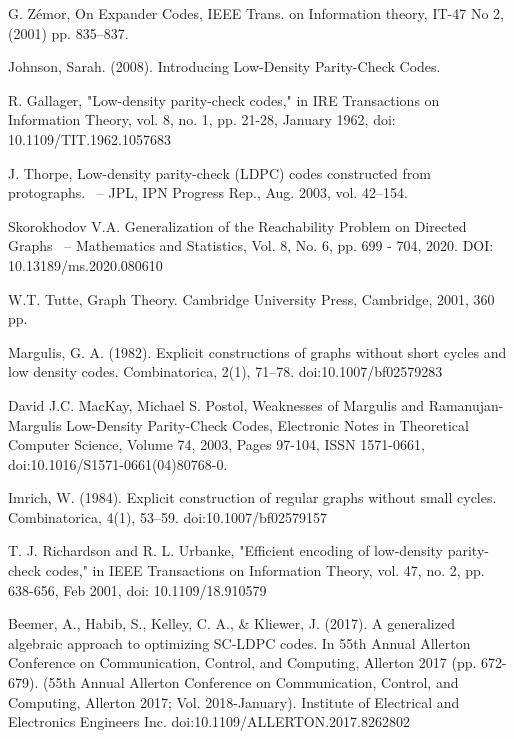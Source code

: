 \documentclass[a4paper,fleqn]{cas-sc}
\newcounter{definition}[section]
\begin{document}
\begin{thebibliography}{0}

G. Zémor, On Expander Codes, IEEE Trans. on Information theory, IT-47
No 2, (2001) pp. 835–837.
  
Johnson, Sarah. (2008). Introducing Low-Density Parity-Check Codes. 

R. Gallager, "Low-density parity-check codes," in IRE Transactions on Information Theory, vol. 8, no. 1, pp. 21-28, January 1962, doi: 10.1109/TIT.1962.1057683

J. Thorpe,
Low-density parity-check (LDPC) codes constructed from protographs.
~-- JPL, IPN Progress Rep., Aug. 2003, vol. 42–154.

Skorokhodov V.A. Generalization of the Reachability Problem on Directed Graphs
~-- Mathematics and Statistics, Vol. 8, No. 6, pp. 699 - 704, 2020. DOI: 10.13189/ms.2020.080610

W.T. Tutte, Graph Theory. Cambridge University Press, Cambridge, 2001, 360 pp.

Margulis, G. A. (1982). Explicit constructions of graphs without short cycles and low density codes. Combinatorica, 2(1), 71–78. 
doi:10.1007/bf02579283

David J.C. MacKay, Michael S. Postol, Weaknesses of Margulis and Ramanujan-Margulis Low-Density Parity-Check Codes, Electronic Notes in Theoretical Computer Science, Volume 74, 2003, Pages 97-104, ISSN 1571-0661, doi:10.1016/S1571-0661(04)80768-0.

Imrich, W. (1984). Explicit construction of regular graphs without small cycles. Combinatorica, 4(1), 53–59. doi:10.1007/bf02579157 

T. J. Richardson and R. L. Urbanke, "Efficient encoding of low-density parity-check codes," in IEEE Transactions on Information Theory, vol. 47, no. 2, pp. 638-656, Feb 2001, doi: 10.1109/18.910579

Beemer, A., Habib, S., Kelley, C. A., & Kliewer, J. (2017). A generalized algebraic approach to optimizing SC-LDPC codes. In 55th Annual Allerton Conference on Communication, Control, and Computing, Allerton 2017 (pp. 672-679). (55th Annual Allerton Conference on Communication, Control, and Computing, Allerton 2017; Vol. 2018-January). Institute of Electrical and Electronics Engineers Inc. doi:10.1109/ALLERTON.2017.8262802


\end{thebibliography}
\end{document}
